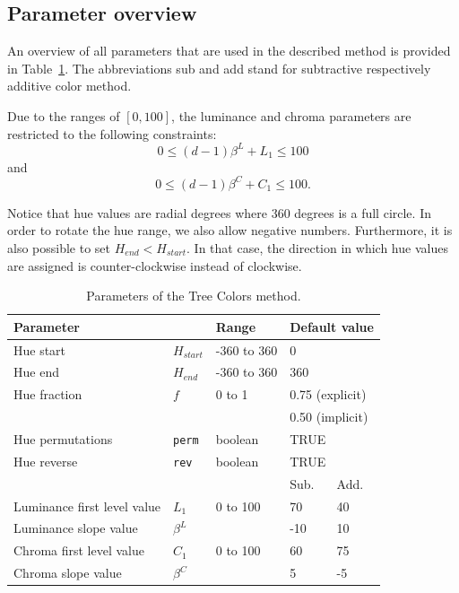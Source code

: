 \documentclass[review,journal]{vgtc}         %
\begin{document}
\subsection{Parameter overview}

An overview of all parameters that are used in the described method is provided in Table~\ref{table:param}. The abbreviations sub and add stand for subtractive respectively additive color method.

Due to the ranges of $[0, 100]$, the luminance and chroma parameters are restricted to the following constraints:
\begin{equation}
0 \leq (d-1)\beta^L + L_1 \leq 100
\end{equation}
and 
\begin{equation}
0 \leq (d-1)\beta^C + C_1 \leq 100.
\end{equation}

Notice that hue values are radial degrees where 360 degrees is a full circle. In order to rotate the hue range, we also allow negative numbers. Furthermore, it is also possible to set $H_{end} < H_{start}$. In that case, the direction in which hue values are assigned is counter-clockwise instead of clockwise.

\begin{table}[!htb]
\begin{footnotesize}
\begin{tabular}{lllll}
\toprule
\multicolumn{2}{l}{Parameter    } & Range & \multicolumn{2}{l}{Default value} \\
\midrule
Hue start 				& $H_{start}$ &-360 to 360  & \multicolumn{2}{l}{0}      \\
Hue end   				& $H_{end}$ & -360 to 360 & \multicolumn{2}{l}{360}       \\
Hue fraction 				& $f$	& 0 to 1 & \multicolumn{2}{l}{0.75 (explicit)} \\
					&	&	 & \multicolumn{2}{l}{0.50 (implicit)} \\
Hue permutations 			& \texttt{perm} & boolean & \multicolumn{2}{l}{TRUE}      \\
Hue reverse   			& \texttt{rev} & boolean  & \multicolumn{2}{l}{TRUE}    \\
\cmidrule(r){4-5}
					&		&		& Sub. & Add. \\
\cmidrule(r){4-5}
Luminance first level value 	& $L_1$	& 0 to 100  & 70 & 40      \\
Luminance slope value 		& $\beta^L$ &       & -10  & 10      \\
Chroma first level value 		& $C_1$ &  0 to 100  & 60   & 75    \\
Chroma slope value 		& $\beta^C$ &     & 5   & -5    \\
\bottomrule
\end{tabular}
\end{footnotesize}
\caption{Parameters of the Tree Colors method.}\label{table:param}
\end{table}
\end{document}
